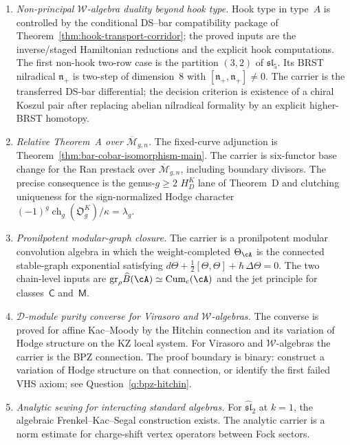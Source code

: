 \begin{enumerate}[label=\textup{(\arabic*)}]
\item \emph{Non-principal $\mathcal W$-algebra duality beyond
 hook type.} Hook type in type~$A$ is controlled by the conditional
 DS--bar compatibility package of
 Theorem~\ref{thm:hook-transport-corridor}; the proved inputs are
 the inverse/staged Hamiltonian reductions and the explicit hook
 computations. The first
 non-hook two-row case is the partition $(3,2)$ of
 $\mathfrak{sl}_5$. Its BRST nilradical
 $\mathfrak n_+$ is two-step of dimension~$8$ with
 $[\mathfrak n_+,\mathfrak n_+]\neq0$. The carrier is the
 transferred DS-bar differential; the decision criterion is existence
 of a chiral Koszul pair after replacing abelian nilradical formality
 by an explicit higher-BRST homotopy.
\item \emph{Relative Theorem~A over
 $\overline{\mathcal M}_{g,n}$.} The fixed-curve adjunction is
 Theorem~\ref{thm:bar-cobar-isomorphism-main}. The carrier is
 six-functor base change for the Ran prestack over
 $\overline{\mathcal M}_{g,n}$, including boundary divisors. The
 precise consequence is the genus-$g\geq2$ $H_D^K$ lane of
 Theorem~D and clutching uniqueness for the sign-normalized Hodge
 character $(-1)^g\operatorname{ch}_g(\mathfrak O_g^K)/\kappa
 =\lambda_g$.
\item \emph{Pronilpotent modular-graph closure.} The carrier is a
 pronilpotent modular convolution algebra in which the
 weight-completed $\Theta_\cA$ is the connected stable-graph
 exponential satisfying
 $d\Theta+\frac12[\Theta,\Theta]+\hbar\,\Delta\Theta=0$. The two
 chain-level inputs are
 $\mathrm{gr}_\rho\widehat B(\cA)\simeq\mathrm{Cum}_c(\cA)$
 and the jet principle for classes~$\mathsf C$ and~$\mathsf M$.
\item \emph{$\mathcal D$-module purity converse for Virasoro and
 $\mathcal W$-algebras.} The converse is proved for affine
 Kac--Moody by the Hitchin connection and its variation of Hodge
 structure on the KZ local system. For Virasoro and
 $\mathcal W$-algebras the carrier is the BPZ connection. The
 proof boundary is binary: construct a variation of Hodge structure
 on that connection, or identify the first failed VHS axiom; see
 Question~\ref{q:bpz-hitchin}.
\item \emph{Analytic sewing for interacting standard algebras.} For
 $\widehat{\mathfrak{sl}}_2$ at $k=1$, the algebraic
 Frenkel--Kac--Segal construction exists. The analytic carrier is a
 norm estimate for charge-shift vertex operators between Fock sectors.

\end{enumerate}
